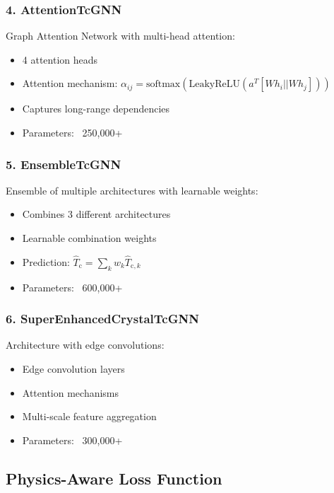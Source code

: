 \documentclass[11pt,a4paper]{article}
\begin{document}
\subsubsection{4. AttentionTcGNN}

Graph Attention Network with multi-head attention:

\begin{itemize}
    \item 4 attention heads
    \item Attention mechanism: $\alpha_{ij} = \text{softmax}(\text{LeakyReLU}(a^T[W h_i || W h_j]))$
    \item Captures long-range dependencies
    \item Parameters: ~250,000+
\end{itemize}

\subsubsection{5. EnsembleTcGNN}

Ensemble of multiple architectures with learnable weights:

\begin{itemize}
    \item Combines 3 different architectures
    \item Learnable combination weights
    \item Prediction: $\hat{T}_{\text{c}} = \sum_k w_k \hat{T}_{\text{c},k}$
    \item Parameters: ~600,000+
\end{itemize}

\subsubsection{6. SuperEnhancedCrystalTcGNN}

Architecture with edge convolutions:

\begin{itemize}
    \item Edge convolution layers
    \item Attention mechanisms
    \item Multi-scale feature aggregation
    \item Parameters: ~300,000+
\end{itemize}

\subsection{Physics-Aware Loss Function}
\end{document}
